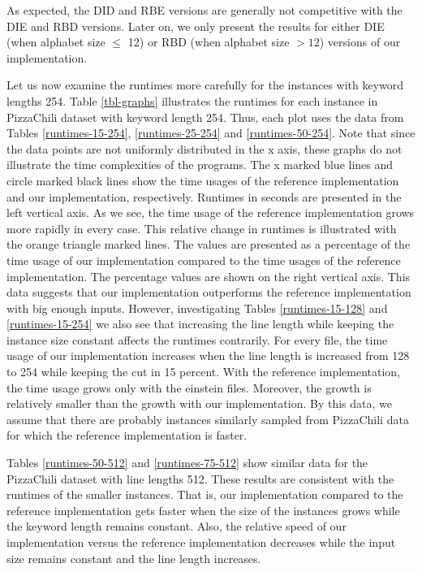 \documentclass[english,twoside,censored,csm,algorithms-track-2020]{HYthesisML}
\theoremstyle{plain}
\theoremstyle{definition}
\numberwithin{testexample}{chapter}
\begin{document}
As expected, the DID and RBE versions are generally not competitive with the DIE
and RBD versions.
Later on, we only present the results for either DIE (when alphabet size $\leq$ 12)
or RBD (when alphabet size $>12$) versions of our implementation.

Let us now examine the runtimes more carefully for the instances with keyword lengths 254.
Table \ref{tbl-graphs} illustrates the runtimes for each instance in PizzaChili dataset
with keyword length 254.
Thus, each plot uses the data from Tables
\ref{runtimes-15-254}, \ref{runtimes-25-254} and \ref{runtimes-50-254}.
Note that since the data points are not uniformly distributed in the x axis,
these graphs do not illustrate the time complexities of the programs. 
The x marked blue lines and circle marked black lines show the time usages of the reference
implementation and our implementation, respectively. Runtimes in seconds are presented in the
left vertical axis. As we see, the time usage of the reference implementation grows
more rapidly in every case. This relative change in runtimes is illustrated with
the orange triangle marked lines.
The values are presented as a percentage of the time usage of our implementation
compared to the time usages of the reference implementation.
The percentage values are shown on the right vertical axis.
This data suggests that our implementation outperforms the reference implementation
with big enough inputs. However, investigating Tables \ref{runtimes-15-128} and
\ref{runtimes-15-254} we also see
that increasing the line length while keeping the instance size constant affects
the runtimes contrarily. For every file, the time usage of our implementation
increases when the line length is increased from 128 to 254 while keeping the
cut in 15 percent. With the reference implementation, the time usage grows only
with the einstein files. Moreover, the growth is relatively smaller than the growth with
our implementation. By this data, we assume that there are probably instances similarly sampled
from PizzaChili data for which the reference implementation is faster.

Tables \ref{runtimes-50-512} and \ref{runtimes-75-512} show similar data for the PizzaChili
dataset with line lengths 512. These results are consistent with the runtimes of the smaller instances.
That is, our implementation compared to the reference implementation gets faster when the size of
the instances grows while the keyword length remains constant. Also, the relative speed of our
implementation versus the reference implementation decreases while the input size remains constant and the
line length increases. 
\end{document}
